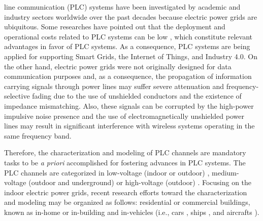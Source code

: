 \documentclass[journal]{IEEEtran}
\begin{document}
 line communication (PLC) systems have been investigated by academic and industry sectors worldwide over the past decades because %
electric power grids are ubiquitous. Some researches have pointed out that the deployment and operational costs related to \ac{PLC} systems can be low \cite{Hrasnica:PLC_design, Dib}, which constitute relevant advantages in favor of \ac{PLC} systems. As a consequence, \ac{PLC} systems are being applied for supporting Smart Grids, the Internet of Things, and Industry $4.0$. On the other hand, electric power grids were not originally designed for data communication purposes and, as a consequence, the propagation of information carrying signals through power lines may suffer severe attenuation and frequency-selective fading due to the use of unshielded conductors and the existence of impedance mismatching. Also, these signals can be corrupted by the high-power impulsive noise presence and the use of electromagnetically unshielded power lines may result in significant interference with wireless systems operating in the same frequency band. %

Therefore, the characterization and modeling of \ac{PLC} channels are mandatory tasks to be \textit{a priori} accomplished for fostering advances in \ac{PLC} systems. The \ac{PLC} channels are categorized in low-voltage (indoor or outdoor) \cite{Zhai:low}, medium-voltage (outdoor and underground) \cite{Lazaropoulos} or high-voltage (outdoor) \cite{Zajc}. Focusing on the indoor electric power grids, recent research efforts toward the characterization and modeling may be organized as follows: residential or commercial buildings, known as in-home or in-building \cite{Amirshahi:PLC,Tlich:Indoor} and in-vehicles (i.e., cars \cite{Vallejo:Vehicle_PLC}, ships \cite{Barmada:Ships_PLC}, and aircrafts \cite{Jones:Aircraft_PLC,Andrey2016}). %
\end{document}
